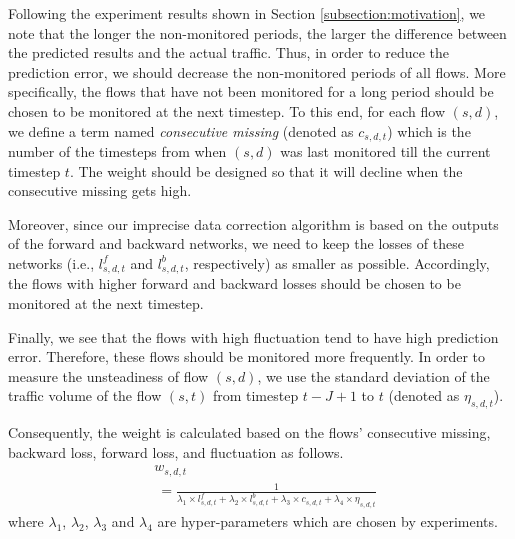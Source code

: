 Following the experiment results shown in Section \ref{subsection:motivation}, we note that the longer the non-monitored periods, the larger the difference between the predicted results and the actual traffic. Thus, in order to reduce the prediction error, we should decrease the non-monitored periods of all flows. More specifically, the flows that have not been monitored for a long period should be chosen to be monitored at the next timestep. To this end, for each flow $(s,d)$, we define a term named \textit{consecutive missing} (denoted as $c_{s,d,t}$) which is the number of the timesteps from when $(s,d)$ was last monitored till the current timestep $t$. The weight should be designed so that it will decline when the consecutive missing gets high.

Moreover, since our imprecise data correction algorithm is based on the outputs of the forward and backward networks, we need to keep the losses of these networks (i.e., $l^f_{s,d,t}$ and $l^b_{s,d,t}$, respectively) as smaller as possible. Accordingly, the flows with higher forward and backward losses should be chosen to be monitored at the next timestep.

Finally, we see that the flows with high fluctuation tend to have high prediction error. Therefore, these flows should be monitored more frequently. In order to measure the unsteadiness of flow $(s,d)$, we use the standard deviation of the traffic volume of the flow $(s,t)$ from timestep $t-J+1$ to $t$ (denoted as $\eta_{s,d,t}$). 

Consequently, the weight is calculated based on the flows' consecutive missing, backward loss, forward loss, and fluctuation as follows.
\begin{equation}
\label{eq_flow_weight}
\begin{aligned}
&w_{s,d,t} \\
& \ = \frac{1}{\lambda_1 \times l^f_{s,d,t} + \lambda_2 \times l^b_{s,d,t} + \lambda_3 \times c_{s,d,t} + \lambda_4 \times \eta_{s,d,t}}
\end{aligned}
\end{equation}
where $\lambda_1$, $\lambda_2$, $\lambda_3$ and $\lambda_4$ are hyper-parameters which are chosen by experiments.  

